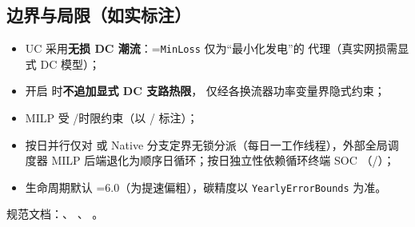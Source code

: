 \documentclass[UTF8,fontset=fandol,a4paper,11pt]{ctexart}
\begin{document}
\subsection{边界与局限（如实标注）}
\begin{itemize}
  \item UC 采用\textbf{无损 DC 潮流}：=\texttt{MinLoss} 仅为“最小化发电”的
        代理（真实网损需显式 DC 模型）；
  \item 开启  时\textbf{不追加显式 DC 支路热限}，
        仅经各换流器功率变量界隐式约束；
  \item MILP 受 /时限约束（以 / 标注）；
  \item 按日并行仅对  或 Native 分支定界无锁分派（每日一工作线程），外部全局调度器
        MILP 后端退化为顺序日循环；按日独立性依赖循环终端 SOC
        （/）；
  \item 生命周期默认 =$6.0$（为提速偏粗），碳精度以 \texttt{YearlyErrorBounds} 为准。
\end{itemize}
规范文档：、
、
。

\end{document}
